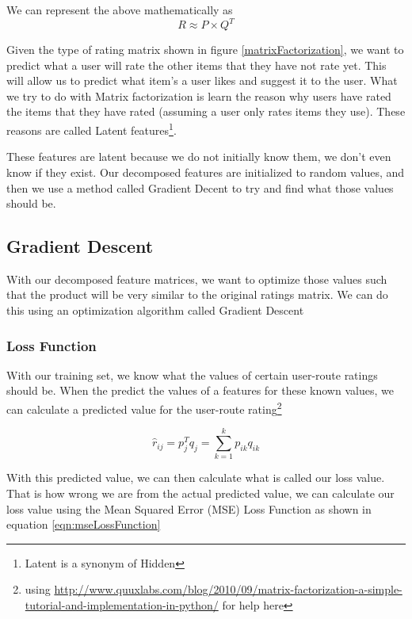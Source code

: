 We can represent the above mathematically as
\begin{equation}
    R \approx P \times Q^T
\end{equation}

Given the type of rating matrix shown in figure \ref{matrixFactorization}, we want to predict what a user will rate the other items that they have not rate yet. This will allow us to predict what item's a user likes and suggest it to the user. What we try to do with Matrix factorization is learn the reason why users have rated the items that they have rated (assuming a user only rates items they use). These reasons are called Latent features\footnote{Latent is a synonym of Hidden}.

These features are latent because we do not initially know them, we don't even know if they exist. Our decomposed features are initialized to random values, and then we use a method called Gradient Decent to try and find what those values should be.

\subsection{Gradient Descent}
With our decomposed feature matrices, we want to optimize those values such that the product will be very similar to the original ratings matrix. We can do this using an optimization algorithm called Gradient Descent \cite{ruder2016overview}



\subsubsection{Loss Function}
With our training set, we know what the values of certain user-route ratings should be. When the predict the values of a features for these known values, we can calculate a predicted value for the user-route rating\footnote{using \url{http://www.quuxlabs.com/blog/2010/09/matrix-factorization-a-simple-tutorial-and-implementation-in-python/} for help here}

\begin{equation}
    \hat{r}_{ij} = {p^{T}_{j}}{q_j}=\sum_{k=1}^{k}{p_{ik}q_{ik}}
\end{equation}

With this predicted value, we can then calculate what is called our loss value. That is how wrong we are from the actual predicted value, we can calculate our loss value using the Mean Squared Error (MSE) Loss Function as shown in equation \ref{eqn:mseLossFunction}

